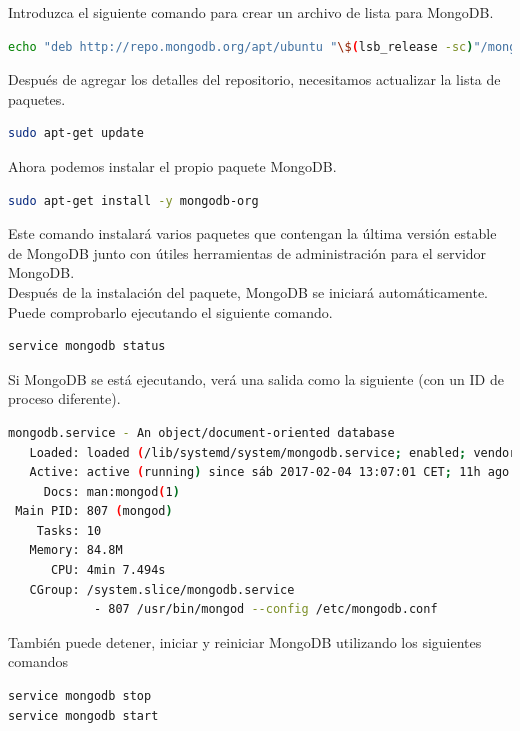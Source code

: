 Introduzca el siguiente comando para crear un archivo de lista para MongoDB.

\begin{lstlisting}[language=bash]
echo "deb http://repo.mongodb.org/apt/ubuntu "\$(lsb_release -sc)"/mongodb-org/3.0 multiverse" | sudo tee /etc/apt/sources.list.d/mongodb-org-3.0.list
\end{lstlisting}

Después de agregar los detalles del repositorio, necesitamos actualizar la lista de paquetes.

\begin{lstlisting}[language=bash]
sudo apt-get update
\end{lstlisting}


Ahora podemos instalar el propio paquete MongoDB.

\begin{lstlisting}[language=bash]
sudo apt-get install -y mongodb-org
\end{lstlisting}

Este comando instalará varios paquetes que contengan la última versión estable de MongoDB junto con útiles herramientas de administración para el servidor MongoDB.\\

Después de la instalación del paquete, MongoDB se iniciará automáticamente. Puede comprobarlo ejecutando el siguiente comando.

\begin{lstlisting}[language=bash]
service mongodb status
\end{lstlisting}

Si MongoDB se está ejecutando, verá una salida como la siguiente (con un ID de proceso diferente).

\begin{lstlisting}[language=bash]
 mongodb.service - An object/document-oriented database
   Loaded: loaded (/lib/systemd/system/mongodb.service; enabled; vendor preset: enabled)
   Active: active (running) since sáb 2017-02-04 13:07:01 CET; 11h ago
     Docs: man:mongod(1)
 Main PID: 807 (mongod)
    Tasks: 10
   Memory: 84.8M
      CPU: 4min 7.494s
   CGroup: /system.slice/mongodb.service
            - 807 /usr/bin/mongod --config /etc/mongodb.conf
\end{lstlisting}

También puede detener, iniciar y reiniciar MongoDB utilizando los siguientes comandos

\begin{lstlisting}[language=bash]
service mongodb stop
service mongodb start
\end{lstlisting}


